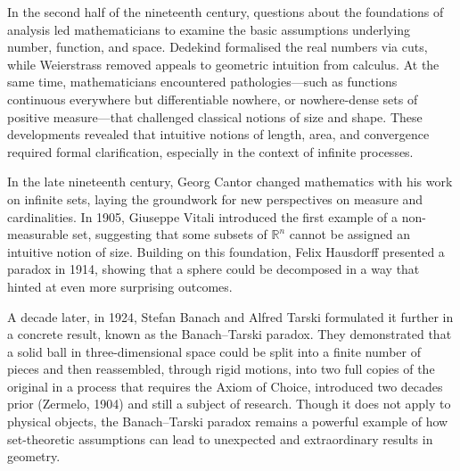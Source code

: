 \begin{historical}
In the second half of the nineteenth century, questions about the foundations of analysis led mathematicians to examine the basic assumptions underlying number, function, and space. Dedekind formalised the real numbers via cuts, while Weierstrass removed appeals to geometric intuition from calculus. At the same time, mathematicians encountered pathologies—such as functions continuous everywhere but differentiable nowhere, or nowhere-dense sets of positive measure—that challenged classical notions of size and shape. These developments revealed that intuitive notions of length, area, and convergence required formal clarification, especially in the context of infinite processes.

In the late nineteenth century, Georg Cantor changed mathematics with his work on infinite sets, laying the groundwork for new perspectives on measure and cardinalities. In 1905, Giuseppe Vitali introduced the first example of a non-measurable set, suggesting that some subsets of \( \mathbb{R}^n \) cannot be assigned an intuitive notion of size. Building on this foundation, Felix Hausdorff presented a paradox in 1914, showing that a sphere could be decomposed in a way that hinted at even more surprising outcomes.

A decade later, in 1924, Stefan Banach and Alfred Tarski formulated it further in a concrete result, known as the Banach–Tarski paradox. They demonstrated that a solid ball in three-dimensional space could be split into a finite number of pieces and then reassembled, through rigid motions, into two full copies of the original in a process that requires the Axiom of Choice, introduced two decades prior (Zermelo, 1904) and still a subject of research. Though it does not apply to physical objects, the Banach–Tarski paradox remains a powerful example of how set-theoretic assumptions can lead to unexpected and extraordinary results in geometry.
\end{historical}

